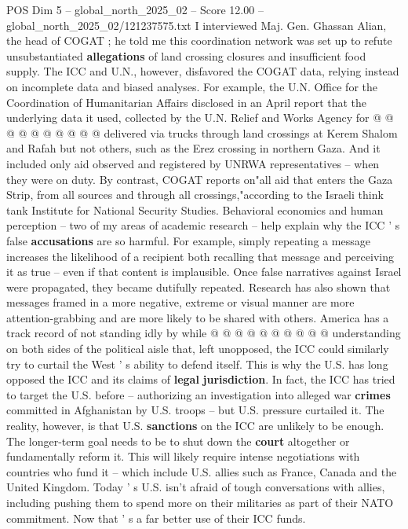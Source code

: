 \begin{textsample}{POS Dim 5 – global\_north\_2025\_02 – Score 12.00 – global\_north\_2025\_02/121237575.txt}
I interviewed Maj.
Gen.
Ghassan Alian, the head of COGAT ; he told me this coordination network was set up to refute unsubstantiated \textbf{allegations} of land crossing closures and insufficient food supply.
The ICC and U.N., however, disfavored the COGAT data, relying instead on incomplete data and biased analyses.
For example, the U.N.
Office for the Coordination of Humanitarian Affairs disclosed in an April report that the underlying data it used, collected by the U.N.
Relief and Works Agency for @ @ @ @ @ @ @ @ @ @ delivered via trucks through land crossings at Kerem Shalom and Rafah but not others, such as the Erez crossing in northern Gaza.
And it included only aid observed and registered by UNRWA representatives -- when they were on duty.
By contrast, COGAT reports on"all aid that enters the Gaza Strip, from all sources and through all crossings,"according to the Israeli think tank Institute for National Security Studies.
Behavioral economics and human perception -- two of my areas of academic research -- help explain why the ICC ' s false \textbf{accusations} are so harmful.
For example, simply repeating a message increases the likelihood of a recipient both recalling that message and perceiving it as true -- even if that content is implausible.
Once false narratives against Israel were propagated, they became dutifully repeated.
Research has also shown that messages framed in a more negative, extreme or visual manner are more attention-grabbing and are more likely to be shared with others.
America has a track record of not standing idly by while @ @ @ @ @ @ @ @ @ @ understanding on both sides of the political aisle that, left unopposed, the ICC could similarly try to curtail the West ' s ability to defend itself.
This is why the U.S. has long opposed the ICC and its claims of \textbf{legal} \textbf{jurisdiction}.
In fact, the ICC has tried to target the U.S. before -- authorizing an investigation into alleged war \textbf{crimes} committed in Afghanistan by U.S. troops -- but U.S. pressure curtailed it.
The reality, however, is that U.S. \textbf{sanctions} on the ICC are unlikely to be enough.
The longer-term goal needs to be to shut down the \textbf{court} altogether or fundamentally reform it.
This will likely require intense negotiations with countries who fund it -- which include U.S. allies such as France, Canada and the United Kingdom.
Today ' s U.S. isn't afraid of tough conversations with allies, including pushing them to spend more on their militaries as part of their NATO commitment.
Now that ' s a far better use of their ICC funds.

\end{textsample}

